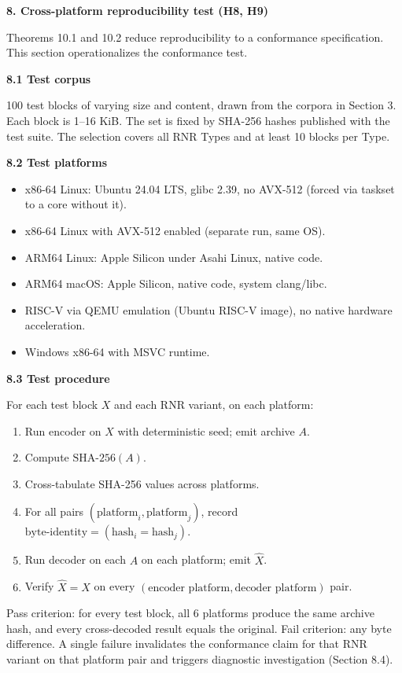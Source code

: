 \documentclass[
]{article}
\begin{document}
\textbf{8. Cross-platform reproducibility test (H8, H9)}

Theorems 10.1 and 10.2 reduce reproducibility to a conformance
specification. This section operationalizes the conformance test.

\textbf{8.1 Test corpus}

100 test blocks of varying size and content, drawn from the corpora in
Section 3. Each block is 1--16 KiB. The set is fixed by SHA-256 hashes
published with the test suite. The selection covers all RNR Types and at
least 10 blocks per Type.

\textbf{8.2 Test platforms}

\begin{itemize}
\item
  x86-64 Linux: Ubuntu 24.04 LTS, glibc 2.39, no AVX-512 (forced via
  taskset to a core without it).
\item
  x86-64 Linux with AVX-512 enabled (separate run, same OS).
\item
  ARM64 Linux: Apple Silicon under Asahi Linux, native code.
\item
  ARM64 macOS: Apple Silicon, native code, system clang/libc.
\item
  RISC-V via QEMU emulation (Ubuntu RISC-V image), no native hardware
  acceleration.
\item
  Windows x86-64 with MSVC runtime.
\end{itemize}

\textbf{8.3 Test procedure}

For each test block $X$ and each RNR variant, on each platform:
\begin{enumerate}
\item Run encoder on $X$ with deterministic seed; emit archive $A$.
\item Compute $\mathrm{SHA\text{-}256}(A)$.
\item Cross-tabulate SHA-256 values across platforms.
\item For all pairs $(\text{platform}_i, \text{platform}_j)$, record
$\text{byte-identity} = (\text{hash}_i = \text{hash}_j)$.
\item Run decoder on each $A$ on each platform; emit $\hat{X}$.
\item Verify $\hat{X} = X$ on every
$(\text{encoder platform}, \text{decoder platform})$ pair.
\end{enumerate}

Pass criterion: for every test block, all 6 platforms produce the same
archive hash, and every cross-decoded result equals the original. Fail
criterion: any byte difference. A single failure invalidates the
conformance claim for that RNR variant on that platform pair and
triggers diagnostic investigation (Section 8.4).
\end{document}
